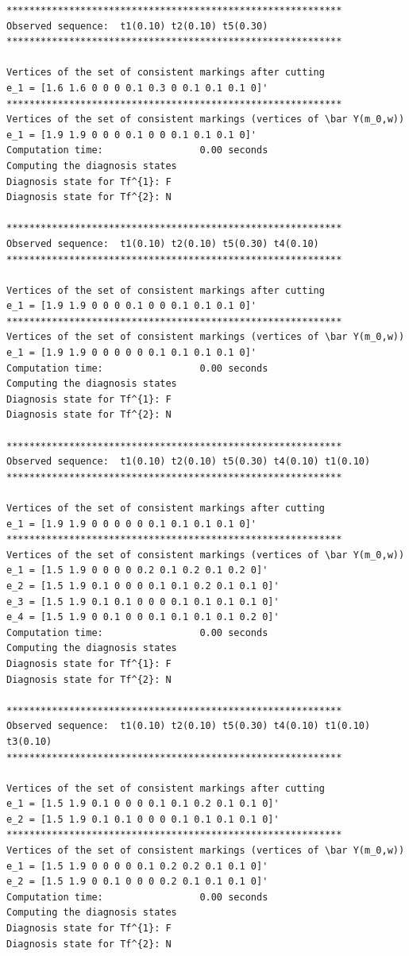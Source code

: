 \begin{verbatim}
***********************************************************
Observed sequence:  t1(0.10) t2(0.10) t5(0.30)
***********************************************************

Vertices of the set of consistent markings after cutting
e_1 = [1.6 1.6 0 0 0 0.1 0.3 0 0.1 0.1 0.1 0]'
***********************************************************
Vertices of the set of consistent markings (vertices of \bar Y(m_0,w))
e_1 = [1.9 1.9 0 0 0 0.1 0 0 0.1 0.1 0.1 0]'
Computation time:                 0.00 seconds
Computing the diagnosis states
Diagnosis state for Tf^{1}: F
Diagnosis state for Tf^{2}: N

***********************************************************
Observed sequence:  t1(0.10) t2(0.10) t5(0.30) t4(0.10)
***********************************************************

Vertices of the set of consistent markings after cutting
e_1 = [1.9 1.9 0 0 0 0.1 0 0 0.1 0.1 0.1 0]'
***********************************************************
Vertices of the set of consistent markings (vertices of \bar Y(m_0,w))
e_1 = [1.9 1.9 0 0 0 0 0 0.1 0.1 0.1 0.1 0]'
Computation time:                 0.00 seconds
Computing the diagnosis states
Diagnosis state for Tf^{1}: F
Diagnosis state for Tf^{2}: N

***********************************************************
Observed sequence:  t1(0.10) t2(0.10) t5(0.30) t4(0.10) t1(0.10)
***********************************************************

Vertices of the set of consistent markings after cutting
e_1 = [1.9 1.9 0 0 0 0 0 0.1 0.1 0.1 0.1 0]'
***********************************************************
Vertices of the set of consistent markings (vertices of \bar Y(m_0,w))
e_1 = [1.5 1.9 0 0 0 0 0.2 0.1 0.2 0.1 0.2 0]'
e_2 = [1.5 1.9 0.1 0 0 0 0.1 0.1 0.2 0.1 0.1 0]'
e_3 = [1.5 1.9 0.1 0.1 0 0 0 0.1 0.1 0.1 0.1 0]'
e_4 = [1.5 1.9 0 0.1 0 0 0.1 0.1 0.1 0.1 0.2 0]'
Computation time:                 0.00 seconds
Computing the diagnosis states
Diagnosis state for Tf^{1}: F
Diagnosis state for Tf^{2}: N

***********************************************************
Observed sequence:  t1(0.10) t2(0.10) t5(0.30) t4(0.10) t1(0.10) t3(0.10)
***********************************************************

Vertices of the set of consistent markings after cutting
e_1 = [1.5 1.9 0.1 0 0 0 0.1 0.1 0.2 0.1 0.1 0]'
e_2 = [1.5 1.9 0.1 0.1 0 0 0 0.1 0.1 0.1 0.1 0]'
***********************************************************
Vertices of the set of consistent markings (vertices of \bar Y(m_0,w))
e_1 = [1.5 1.9 0 0 0 0 0.1 0.2 0.2 0.1 0.1 0]'
e_2 = [1.5 1.9 0 0.1 0 0 0 0.2 0.1 0.1 0.1 0]'
Computation time:                 0.00 seconds
Computing the diagnosis states
Diagnosis state for Tf^{1}: F
Diagnosis state for Tf^{2}: N
\end{verbatim}

\newpage
